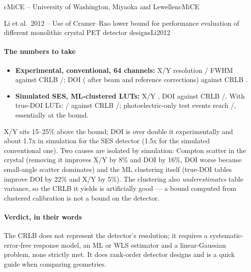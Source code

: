 \begin{programnote}{cMiCE -- University of Washington, Miyaoka and Lewellen}{cMiCE}
\begin{papernote}{Li et al.\ 2012 -- Use of Cramer--Rao lower bound for performance evaluation of different monolithic crystal PET detector designs}{Li2012}
\paragraph{The numbers to take}
\begin{itemize}
	\item \textbf{Experimental, conventional, 64 channels:} X/Y resolution
		/ FWHM against CRLB /; DOI 
		( after beam and reference corrections) against CRLB .
	\item \textbf{Simulated SES, ML-clustered LUTs:} X/Y , DOI 
		against CRLB /. With true-DOI LUTs: /
		against CRLB /; photoelectric-only test events reach
		/, essentially at the bound.
\end{itemize}
X/Y sits 15--25\% above the bound; DOI is over double it experimentally and
about 1.7x in simulation for the SES detector (1.5x for the simulated
conventional one). Two causes are isolated by simulation: Compton scatter in the
crystal (removing it improves X/Y by 8\% and DOI by 16\%, DOI worse because
small-angle scatter dominates) and the ML clustering itself (true-DOI tables
improve DOI by 22\% and X/Y by 5\%). The clustering also \emph{underestimates} table variance,
so the CRLB it yields is artificially good --- a bound computed from clustered
calibration is not a bound on the detector.

\paragraph{Verdict, in their words}
The CRLB does not represent the detector's resolution; it requires a
systematic-error-free response model, an ML or WLS estimator and a
linear-Gaussian problem, none strictly met. It does rank-order detector designs
and is a quick guide when comparing geometries. 


\end{papernote}
\end{programnote}

